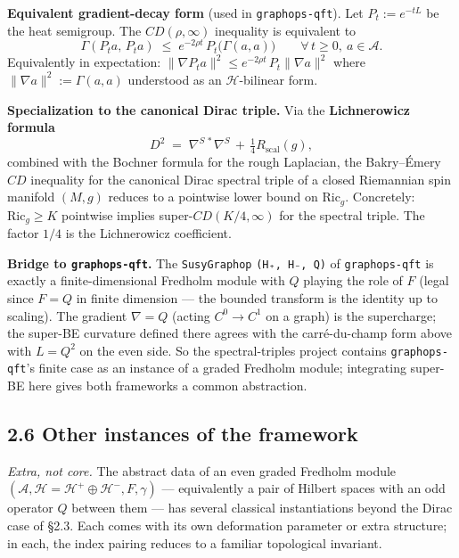 \documentclass[
  11pt,
]{article}
\begin{document}
\textbf{Equivalent gradient-decay form} (used in \texttt{graphops-qft}).
Let \(P_t := e^{-tL}\) be the heat semigroup. The \(CD(\rho, \infty)\)
inequality is equivalent to \[
\Gamma(P_t a,\,P_t a) \;\leq\; e^{-2\rho t}\,P_t\bigl(\Gamma(a, a)\bigr)
\qquad \forall\, t \geq 0,\ a \in \mathcal{A}.
\] Equivalently in expectation:
\(\|\nabla P_t a\|^2 \leq e^{-2\rho t}\,P_t \|\nabla a\|^2\) where
\(\|\nabla a\|^2 := \Gamma(a, a)\) understood as an
\(\mathcal{H}\)-bilinear form.

\textbf{Specialization to the canonical Dirac triple.} Via the
\textbf{Lichnerowicz formula} \[
D^2 \;=\; \nabla^{S\,*}\nabla^S \,+\, \tfrac{1}{4} R_{\mathrm{scal}}(g),
\] combined with the Bochner formula for the rough Laplacian, the
Bakry--Émery \(CD\) inequality for the canonical Dirac spectral triple
of a closed Riemannian spin manifold \((M, g)\) reduces to a pointwise
lower bound on \(\mathrm{Ric}_g\). Concretely: \(\mathrm{Ric}_g \geq K\)
pointwise implies super-\(CD(K/4, \infty)\) for the spectral triple. The
factor \(1/4\) is the Lichnerowicz coefficient.

\textbf{Bridge to \texttt{graphops-qft}.} The \texttt{SusyGraphop}
\texttt{(H₊,\ H₋,\ Q)} of \texttt{graphops-qft} is exactly a
finite-dimensional Fredholm module with \(Q\) playing the role of \(F\)
(legal since \(F = Q\) in finite dimension --- the bounded transform is
the identity up to scaling). The gradient \(\nabla = Q\) (acting
\(C^0 \to C^1\) on a graph) is the supercharge; the super-BE curvature
defined there agrees with the carré-du-champ form above with \(L = Q^2\)
on the even side. So the spectral-triples project contains
\texttt{graphops-qft}'s finite case as an instance of a graded Fredholm
module; integrating super-BE here gives both frameworks a common
abstraction.

\subsection{2.6 Other instances of the
framework}\label{other-instances-of-the-framework}

\emph{Extra, not core.} The abstract data of an even graded Fredholm
module
\((\mathcal{A}, \mathcal{H}= \mathcal{H}^+ \oplus \mathcal{H}^-, F, \gamma)\)
--- equivalently a pair of Hilbert spaces with an odd operator \(Q\)
between them --- has several classical instantiations beyond the Dirac
case of §2.3. Each comes with its own deformation parameter or extra
structure; in each, the index pairing reduces to a familiar topological
invariant.
\end{document}
